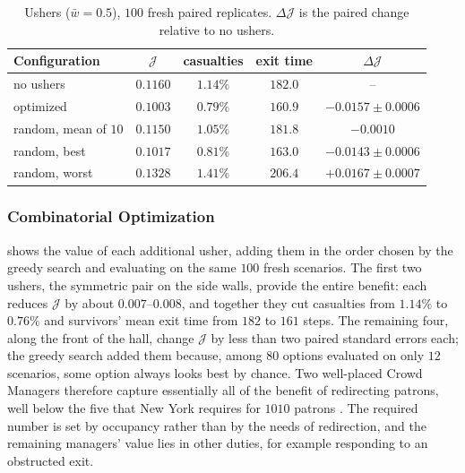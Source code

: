 \documentclass[14pt]{article}
\theoremstyle{definition}
\begin{document}
\begin{table}[H]
  \centering
  \caption{Ushers ($\bar w = 0.5$), $100$ fresh paired replicates. $\Delta\mathcal{J}$ is
  the paired change relative to no ushers.}
  \label{tab:ushers}
  \begin{tabular}{lcccc}
    \toprule
    Configuration & $\mathcal{J}$ & casualties & exit time & $\Delta\mathcal{J}$ \\
    \midrule
    no ushers & $0.1160$ & $1.14\%$ & $182.0$ & -- \\
    optimized & $0.1003$ & $0.79\%$ & $160.9$ & $-0.0157 \pm 0.0006$ \\
    random, mean of $10$ & $0.1150$ & $1.05\%$ & $181.8$ & $-0.0010$ \\
    random, best & $0.1017$ & $0.81\%$ & $163.0$ & $-0.0143 \pm 0.0006$ \\
    random, worst & $0.1328$ & $1.41\%$ & $206.4$ & $+0.0167 \pm 0.0007$ \\
    \bottomrule
  \end{tabular}
\end{table}

\subsubsection{Combinatorial Optimization}\label{sec:results_combinatorial}
 shows the value of each additional usher, adding them in the
order chosen by the greedy search and evaluating on the same $100$ fresh scenarios. The
first two ushers, the symmetric pair on the side walls, provide the entire benefit:
each reduces $\mathcal{J}$ by about $0.007$--$0.008$, and together they cut casualties
from $1.14\%$ to $0.76\%$ and survivors' mean exit time from $182$ to $161$ steps. The
remaining four, along the front of the hall, change $\mathcal{J}$ by less than two paired
standard errors each; the greedy search added them because, among $80$ options evaluated
on only $12$ scenarios, some option always looks best by chance. Two well-placed Crowd
Managers therefore capture essentially all of the benefit of redirecting patrons, well
below the five that New York requires for $1010$ patrons \cite{nycrowd}. The required
number is set by occupancy rather than by the needs of redirection, and the remaining
managers' value lies in other duties, for example responding to an obstructed exit.
\end{document}
